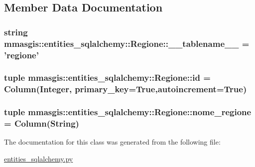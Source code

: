 \subsection{Member Data Documentation}
\hypertarget{classmmasgis_1_1entities__sqlalchemy_1_1Regione_a9e6b64f9904c976bf50dc736eeddc501}{
\subsubsection[{\_\-\_\-tablename\_\-\_\-}]{\setlength{\rightskip}{0pt plus 5cm}string {\bf mmasgis::entities\_\-sqlalchemy::Regione::\_\-\_\-tablename\_\-\_\-} = 'regione'}}
\label{classmmasgis_1_1entities__sqlalchemy_1_1Regione_a9e6b64f9904c976bf50dc736eeddc501}
\hypertarget{classmmasgis_1_1entities__sqlalchemy_1_1Regione_a9c47da6e1cff6a719cf39f1d7db84472}{
\subsubsection[{id}]{\setlength{\rightskip}{0pt plus 5cm}tuple {\bf mmasgis::entities\_\-sqlalchemy::Regione::id} = Column(Integer, primary\_\-key=True,autoincrement=True)}}
\label{classmmasgis_1_1entities__sqlalchemy_1_1Regione_a9c47da6e1cff6a719cf39f1d7db84472}
\hypertarget{classmmasgis_1_1entities__sqlalchemy_1_1Regione_a7bcdf87ccc9f500500e3dbfe18dece61}{
\subsubsection[{nome\_\-regione}]{\setlength{\rightskip}{0pt plus 5cm}tuple {\bf mmasgis::entities\_\-sqlalchemy::Regione::nome\_\-regione} = Column(String)}}
\label{classmmasgis_1_1entities__sqlalchemy_1_1Regione_a7bcdf87ccc9f500500e3dbfe18dece61}


The documentation for this class was generated from the following file:\begin{DoxyCompactItemize}
\item 
\hyperlink{entities__sqlalchemy_8py}{entities\_\-sqlalchemy.py}\end{DoxyCompactItemize}
